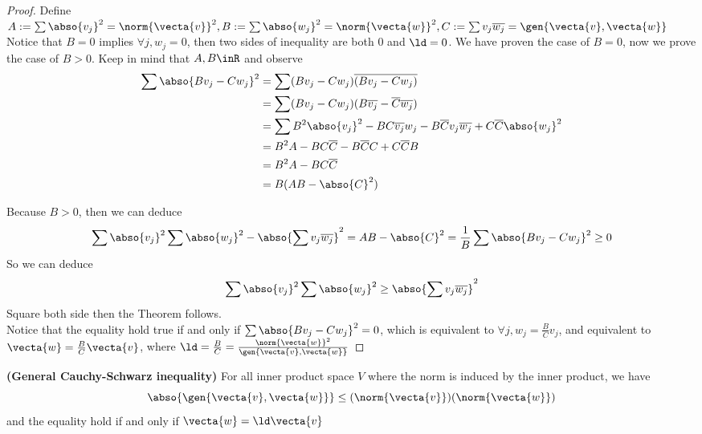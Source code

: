 \documentclass{report}
\begin{document}
\begin{proof}
Define $A:=\sum \abso{v_j}^2=\norm{\vecta{v}}^2,B:=\sum \abso{w_j}^2=\norm{\vecta{w}}^2,C:=\sum v_j\overline{w_j}=\gen{\vecta{v},\vecta{w}}$\\

Notice that $B=0$ implies $\forall j,w_j=0$, then two sides of inequality are both $0$ and  $\ld=0$. We have proven the case of $B=0$, now we prove the case of  $B>0$. Keep in mind that $A,B\inR$ and observe
\begin{align*}
\sum \abso{Bv_j-Cw_j}^2&=\sum (Bv_j-Cw_j)\overline{(Bv_j-Cw_j)}\\
&=\sum (Bv_j-Cw_j)(B\overline{v_j}-\overline{C}\overline{w_j})\\
&=\sum B^2\abso{v_j}^2-BC\overline{v_j}w_j-B\overline{C}v_j\overline{w_j}+C\overline{C}\abso{w_j}^2\\
&=B^2A-BC\overline{C}-B\overline{C}C+C\overline{C}B\\
&=B^2A-BC\overline{C}\\
&=B(AB-\abso{C}^2) 
\end{align*}

Because $B>0$, then we can deduce
\begin{equation*}
\sum \abso{v_j}^2\sum \abso{w_j}^2 - \abso{\sum v_j\overline{w_j}}^2=AB-\abso{C}^2=\frac{1}{B}\sum \abso{Bv_j-Cw_j}^2\geq 0
\end{equation*}
So we can deduce
\begin{equation*}
\sum \abso{v_j}^2\sum \abso{w_j}^2\geq \abso{\sum v_j\overline{w_j}}^2
\end{equation*}
Square both side then the Theorem follows.\\

Notice that the equality hold true if and only if $\sum \abso{Bv_j-Cw_j}^2=0$, which is equivalent to $\forall j, w_j=\frac{B}{C}v_j$, and equivalent to $\vecta{w}=\frac{B}{C}\vecta{v}$, where $\ld =\frac{B}{C}=\frac{\norm{\vecta{w}}^2}{\gen{\vecta{v},\vecta{w}}}$
\end{proof}
\begin{theorem}
\label{1.6.12}
\textbf{(General Cauchy-Schwarz inequality)} For all inner product space $V$ where the norm is induced by the inner product, we have
\begin{equation*}
\abso{\gen{\vecta{v},\vecta{w}}}\leq (\norm{\vecta{v}})(\norm{\vecta{w}})
\end{equation*}
and the equality hold if and only if  $\vecta{w}=\ld \vecta{v}$
\end{theorem}
\end{document}

